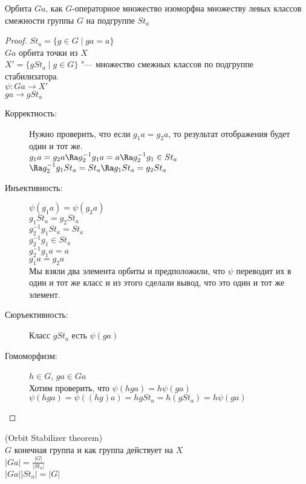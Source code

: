 \begin{theorem}
Орбита $Ga$, как $G$-операторное множество изоморфна
множеству левых классов смежности группы $G$ на подгруппе $St_a$
\end{theorem}
\begin{proof}
$St_a = \{g \in G \mid ga = a\}$\\
$Ga$ орбита точки из $X$\\
$X' = \{gSt_a \mid g \in G\}$ "--- множество смежных классов по подгруппе стабилизатора.\\
$\psi \colon Ga \to X'$\\
$ga \to g St_a$\\
\begin{description}
\item[Корректность:]
Нужно проверить, что если $g_1a = g_2a$, то результат отображения будет один и тот же.\\
$g_1a  = g_2 a \Ra g_2^{-1}g_1a = a \Ra g_2^{-1}g_1 \in St_a$\\
$\Ra g_2^{-1}g_1 St_a = St_a \Ra g_1 St_a = g_2 St_a$\\

\item[Инъективность:]
$\psi (g_1 a) = \psi (g_2a)$\\
$g_1St_a = g_2St_a$\\
$g_2^{-1}g_1St_a = St_a$\\
$g_2^{-1}g_1 \in St_a$\\
$g_2^{-1}g_1a = a$\\
$g_1a = g_2a$\\
Мы взяли два элемента орбиты и предположили, что $\psi$ переводит их
в один и тот же класс и из этого сделали вывод, что это один и тот же элемент. 
\\
\item[Сюръективность:]
Класс $gSt_a$ есть $\psi(ga)$\\

\item[Гомоморфизм:] 
$h \in G$, $ga \in Ga$\\
Хотим проверить, что $\psi(hga) = h \psi(ga)$\\
$\psi(hga) = \psi((hg)a) = hgSt_a = h(gSt_a) = h \psi(ga)$\\
\end{description}
\end{proof}
\begin{conseq}\hfill
(Orbit Stabilizer theorem)\\
$G$ конечная группа и как группа действует на $X$\\
$|Ga| = \frac{|G|}{|St_a|}$\\
$|Ga||St_a| = |G|$\\
\end{conseq}
